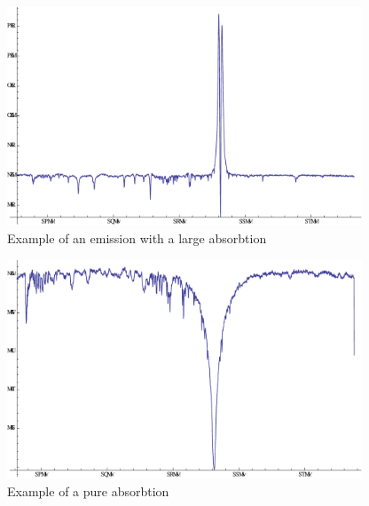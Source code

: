 \documentclass[thesis=B,english]{FITthesis}[2012/10/20]
\begin{document}
\begin{figure}
\centering
\includegraphics[width=300pt]{big_abs_spectrum}
\caption{Example of an emission with a large absorbtion}
\label{fig:large_abs}

\end{figure}
\begin{figure}
\centering
\includegraphics[width=300pt]{absorbtion_spectrum}
\caption{Example of a pure absorbtion}
\label{fig:pure_absrob}

\end{figure}
\end{document}
